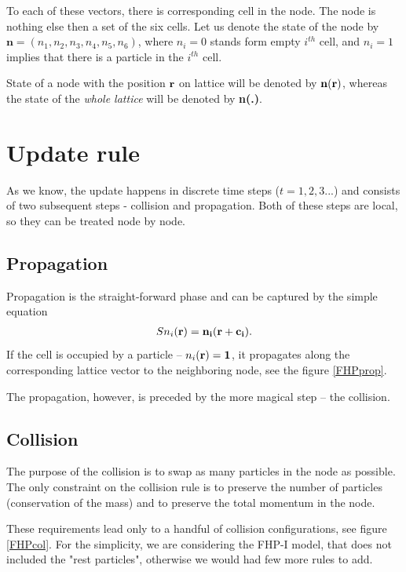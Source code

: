 To each of these vectors, there is corresponding cell in the node.
The node is nothing else then a set of the six cells.
Let us denote the state of the node by $\bm{n} = (n_1,n_2,n_3,n_4,n_5,n_6)$, where $n_i = 0$ stands form empty $i^{th}$ cell, and $n_i = 1$ implies that there is a particle in the $i^{th}$ cell. 

State of a node with the position $\bf{r}$ on lattice will be denoted by $\bf{n(r)}$, whereas the state of the \textit{whole lattice} will be denoted by \textbf{n(.)}.

\section{Update rule}
As we know, the update happens in discrete time steps ($t=1,2,3...$) and consists of two subsequent steps - collision and propagation. Both of these steps are local, so they can be treated node by node.

\subsection{Propagation}

Propagation is the straight-forward phase and can be captured by the simple equation
\begin{align*}
S n_i(\bf{r}) = n_i(\bf{r + c_i}). 
\end{align*}
If the cell is occupied by a particle -- $n_i(\bf{r})=1$, it propagates along the corresponding lattice vector to the neighboring node, see the figure \ref{FHPprop}.

The propagation, however, is preceded by the more magical step -- the collision.

\subsection{Collision}

The purpose of the collision is to swap as many particles in the node as possible.
The only constraint on the collision rule is to preserve the number of particles (conservation of the mass) and to preserve the total momentum in the node.

These requirements lead only to a handful of collision configurations, see figure \ref{FHPcol}. For the simplicity, we are considering the FHP-I model, that does not included the "rest particles", otherwise we would had few more rules to add.

